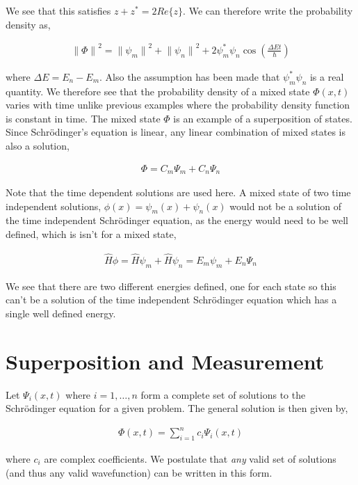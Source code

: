 \documentclass[11pt]{amsart}
\begin{document}
We see that this satisfies $z + z^* = 2 Re\{z\}$. We can therefore write the probability density as,

\begin{align*}
  {\|\Phi\|}^2 = {\|\psi_m\|}^2 + {\|\psi_n\|}^2 + 2\psi_m^* \psi_n \cos{\left(\frac{\Delta E t}{\hbar}\right)}
\end{align*}

where $\Delta E = E_n - E_m$. Also the assumption has been made that $\psi_m^*\psi_n$ is a real quantity. We therefore see that the probability density of a mixed state $\Phi(x, t)$ varies with time unlike previous examples where the probability density function is constant in time. The mixed state $\Phi$ is an example of a superposition of states. Since Schr\"{o}dinger's equation is linear, any linear combination of mixed states is also a solution,

\begin{align*}
  \Phi = C_m \Psi_m + C_n \Psi_n
\end{align*}

Note that the time dependent solutions are used here. A mixed state of two time independent solutions, $\phi(x) = \psi_m(x) + \psi_n(x)$ would not be a solution of the time independent Schr\"{o}dinger equation, as the energy would need to be well defined, which is isn't for a mixed state,

\begin{align*}
  \hat{H}\phi = \hat{H}\psi_m + \hat{H}\psi_n = E_m\psi_m + E_n\Psi_n
\end{align*}

We see that there are two different energies defined, one for each state so this can't be a solution of the time independent Schr\"{o}dinger equation which has a single well defined energy.

\section{Superposition and Measurement}

Let $\Psi_i(x, t)$ where $i = 1, \dots, n$ form a complete set of solutions to the Schr\"{o}dinger equation for a given problem. The general solution is then given by,

\begin{align*}
  \Phi(x, t) = \sum\limits_{i=1}^n c_i \Psi_i(x, t)
\end{align*}

where $c_i$ are complex coefficients. We postulate that \textit{any} valid set of solutions (and thus any valid wavefunction) can be written in this form.
\end{document}
